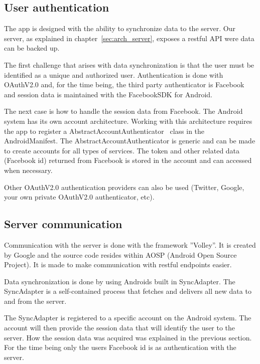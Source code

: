\subsection{User authentication}
The app is designed with the ability to synchronize data to the server. Our server, as explained in chapter~\ref{sec:arch_server}, exposes a restful API were data can be backed up.

The first challenge that arises with data synchronization is that the user must be identified as a unique and authorized user. Authentication is done with OAuthV2.0 and, for the time being, the third party authenticator is Facebook and session data is maintained with the FacebookSDK for Android. 

The next case is how to handle the session data from Facebook. The Android system has its own account architecture. Working with this architecture requires the app to register a AbstractAccountAuthenticator~\cite{androidAccount} class in the AndroidManifest. The AbstractAccountAuthenticator is generic and can be made to create accounts for all types of services. The token and other related data (Facebook id) returned from Facebook is stored in the account and can accessed when necessary.

Other OAuthV2.0 authentication providers can also be used (Twitter, Google, your own private OAuthV2.0 authenticator, etc). 


\subsection{Server communication}
Communication with the server is done with the framework ''Volley''. It is created by Google and the source code resides within AOSP (Android Open Source Project). It is made to make communication with restful endpoints easier.

Data synchronization is done by using Androids built in SyncAdapter. The SyncAdapter is a self-contained process that fetches and delivers all new data to and from the server. 

The SyncAdapter is registered to a specific account on the Android system. The account will then provide the session data that will identify the user to the server. How the session data was acquired was explained in the previous section. For the time being only the users Facebook id is as authentication with the server. 


